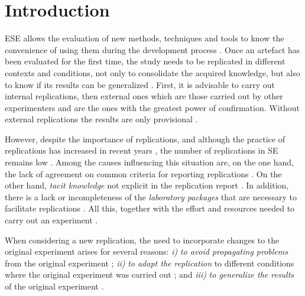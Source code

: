 

\section{Introduction}
\label{sec:intro}

\gls{ESE} allows the evaluation of new methods, techniques and tools to know the convenience of using them during the development process  \cite{sjoberg2005survey}.
Once an artefact has been evaluated for the first time, the study needs to be replicated in different contexts and conditions, not only to consolidate the acquired knowledge, but also to know if its results can be generalized \cite{Baldassarre}.
First, it is advisable to carry out internal replications, then external ones which are those carried out by other experimenters and are the ones with the greatest power of confirmation. Without external replications the results are only provisional \cite{brooks1996replication}.

However, despite the importance of replications, and although the practice of replications has increased in recent years  \cite{da2014replication}, the number of replications in \gls{SE} remains low  \cite{solari2017content}.
Among the causes influencing this situation are, on the one hand, the lack of agreement on common criteria for reporting replications \cite{carver2010towards}.
On the other hand, \emph{tacit knowledge} not explicit in the replication report \cite{shull2002replicating}. In addition, there is a lack or incompleteness of the \emph{laboratory packages} that are necessary to facilitate replications \cite{solari2017content}. All this, together with  the effort and resources needed to carry out an experiment \cite{da2014replication}.

When considering a new replication, the need to incorporate changes to the original experiment arises for several reasons: \emph{i)} \emph{to avoid propagating problems} from the original experiment \cite{kitchenham2008role}; \emph{ii)} \emph{to adapt the replication} to different conditions where the original experiment was carried out \cite{Baldassarre}; and \emph{iii)} \emph{to generalize the results} of the original experiment  \cite{shull2008role}. 

